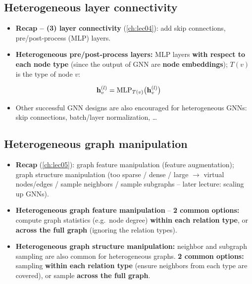 \subsection{Heterogeneous layer connectivity}\label{sec:lec09-layers}

\begin{itemize}
  \item \textbf{Recap -- (3) layer connectivity} (\cref{ch:lec04}): add skip
    connections, pre/post-process (MLP) layers.
  \item \textbf{Heterogeneous pre/post-process layers:} MLP layers \textbf{with
    respect to each node type} (since the output of GNN are \textbf{node
    embeddings}); $T(v)$ is the type of node $v$:
\end{itemize}
\begin{equation}\label{eq:lec09-hmlp}
  \mathbf{h}_v^{(l)} = \mathrm{MLP}_{T(v)}\big(\mathbf{h}_v^{(l)}\big)
\end{equation}
\begin{itemize}
  \item Other successful GNN designs are also encouraged for heterogeneous GNNs:
    skip connections, batch/layer normalization, \dots
\end{itemize}

\subsection{Heterogeneous graph manipulation}\label{sec:lec09-manip}

\begin{itemize}
  \item \textbf{Recap} (\cref{ch:lec05}): graph feature manipulation (feature
    augmentation); graph structure manipulation (too sparse / dense / large
    $\to$ virtual nodes/edges / sample neighbors / sample subgraphs -- later
    lecture: scaling up GNNs).
  \item \textbf{Heterogeneous graph feature manipulation} -- \textbf{2 common
    options:} compute graph statistics (e.g.\ node degree) \textbf{within each
    relation type}, or \textbf{across the full graph} (ignoring the relation
    types).
  \item \textbf{Heterogeneous graph structure manipulation:} neighbor and
    subgraph sampling are also common for heterogeneous graphs. \textbf{2 common
    options:} sampling \textbf{within each relation type} (ensure neighbors from
    each type are covered), or sample \textbf{across the full graph}.
\end{itemize}

